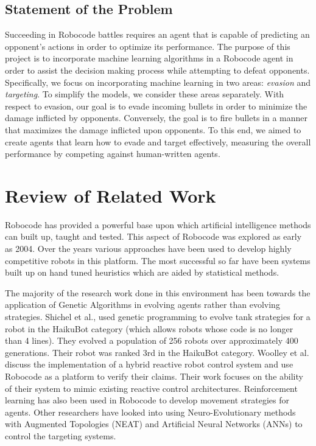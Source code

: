 \documentclass{article}
\theoremstyle{plain}
\theoremstyle{definition}
\theoremstyle{remark}
\begin{document}
\subsection*{Statement of the Problem}

Succeeding in Robocode battles requires an agent that is capable of predicting an opponent's actions in order to optimize its performance. The purpose of this project is to incorporate machine learning algorithms in a Robocode agent in order to assist the decision making process while attempting to defeat opponents. Specifically, we focus on incorporating machine learning in two areas: \emph{evasion} and \emph{targeting}. To simplify the models, we consider these areas separately. With respect to evasion, our goal is to evade incoming bullets in order to minimize the damage inflicted by opponents. Conversely, the goal is to fire bullets in a manner that maximizes the damage inflicted upon opponents. To this end, we aimed to create agents that learn how to evade and target effectively, measuring the overall performance by competing against human-written agents. 

 
\section{Review of Related Work}
Robocode has provided a powerful base upon which artificial intelligence methods can built up, taught and tested. This aspect of Robocode was explored as early as 2004\cite{Hartness}. Over the years various approaches have been used to develop highly competitive robots in this platform. The most successful so far have been systems built up on hand tuned heuristics which are aided by statistical methods. 

The majority of the research work done in this environment has been towards the application of Genetic Algorithms in evolving agents rather than evolving strategies\cite{strategies, gp1, gp2}.  Shichel et al.\cite{gp1}, used genetic programming to evolve tank strategies for a robot in the HaikuBot category (which allows robots whose code is no longer than 4 lines). They evolved a population of 256 robots over approximately 400 generations. Their robot was ranked 3rd in the HaikuBot category. Woolley et al.\cite{woolley} discuss the implementation of a hybrid reactive robot control system and use Robocode as a platform to verify their claims. Their work focuses on the ability of their system to mimic existing reactive control architectures. Reinforcement learning has also been used in Robocode to develop movement strategies for agents\cite{gade}. Other researchers have looked into using Neuro-Evolutionary methods with Augmented Topologies (NEAT) and Artificial Neural Networks (ANNs)\cite{nielsenAI} to control the targeting systems.
\end{document}
